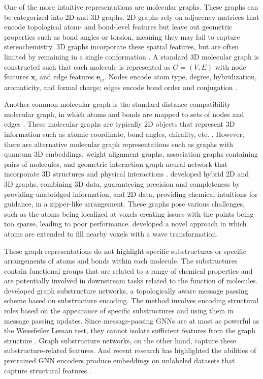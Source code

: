 One of the more intuitive representations are molecular graphs. These graphs can be categorized into 2D and 3D graphs. 2D graphs rely on adjacency matrices that encode topological atom- and bond-level features but leave out geometric properties such as bond angles or torsion, meaning they may fail to capture stereochemistry. 3D graphs incorporate these spatial features, but are often limited by remaining in a single conformation \citep{Zhichun2023}. A standard 3D molecular graph is constructed such that each molecule is represented as $G = (V,E)$ with node features $\mathbf{x}_i$ and edge features $\mathbf{e}_{ij}$. Nodes encode atom type, degree, hybridization, aromaticity, and formal charge; edges encode bond order and conjugation \citep{Zhichun2023}. 

Another common molecular graph is the standard distance compatibility molecular graph, in which atoms and bonds are mapped to sets of nodes and edges \citep{David2020, Hnig2022}. These molecular graphs are typically 2D objects that represent 3D information such as atomic coordinate, bond angles, chirality, etc. \citep{David2020}. However, there are alternative molecular graph representations such as graphs with quantum 3D embeddings, weight alignment graphs, association graphs containing pairs of molecules, and geometric interaction graph neural network that incorporate 3D structures and physical interactions \citep{Hnig2022, yan2023, Yang2023GIGN}. \cite{Du2022} developed hybrid 2D and 3D graphs, combining 3D data, guaranteeing precision and completeness by providing unabridged information, and 2D data, providing chemical intuitions for guidance, in a zipper-like arrangement. These graphs pose various challenges, such as the atoms being localized at voxels creating issues with the points being too sparse, leading to poor performance. \cite{Kuzminykh2018} developed a novel approach in which atoms are extended to fill nearby voxels with a wave transformation.
      
These graph representations do not highlight specific substructures or specific arrangements of atoms and bonds within each molecule. The substructures contain functional groups that are related to a range of chemical properties and are potentially involved in downstream tasks related to the function of molecules. \cite{Bouritsas2023} developed graph substructure networks, a topologically aware message passing scheme based on substructure encoding. The method involves encoding structural roles based on the appearance of specific substructures and using them in message passing updates. Since message-passing GNNs are at most as powerful as the Weissfeiler Leman test, they cannot isolate sufficient features from the graph structure \citep{Bouritsas2023}. Graph substructure networks, on the other hand, capture these substructure-related features. And recent research has highlighted the abilities of pretrained GNN encoders produce embeddings on unlabeled datasets that capture structural features \citep{kishimoto2023, ross2022}. 

